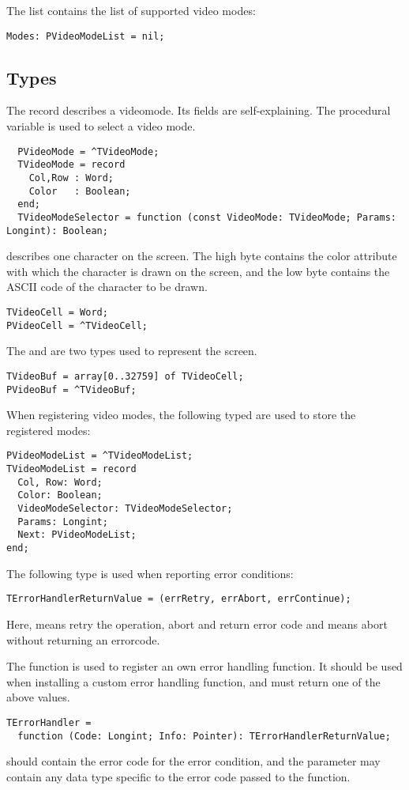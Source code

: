 The  list contains the list of supported video modes:
\begin{verbatim}
Modes: PVideoModeList = nil;
\end{verbatim}

\subsection{Types}
The  record describes a videomode. Its fields are
self-explaining. The  procedural variable
is used to select a video mode.
\begin{verbatim}
  PVideoMode = ^TVideoMode;
  TVideoMode = record
    Col,Row : Word;
    Color   : Boolean;
  end;
  TVideoModeSelector = function (const VideoMode: TVideoMode; Params: Longint): Boolean;
\end{verbatim}
 describes one character on the screen. The high byte
contains the color attribute with which the character is drawn on the screen,
and the low byte contains the ASCII code of the character to be drawn.
\begin{verbatim}
TVideoCell = Word;
PVideoCell = ^TVideoCell;
\end{verbatim}
The  and  are two types used to represent the
screen.
\begin{verbatim}
TVideoBuf = array[0..32759] of TVideoCell;
PVideoBuf = ^TVideoBuf;
\end{verbatim}
When registering video modes, the following typed are used to store the
registered modes:
\begin{verbatim}
PVideoModeList = ^TVideoModeList;
TVideoModeList = record
  Col, Row: Word;
  Color: Boolean;
  VideoModeSelector: TVideoModeSelector;
  Params: Longint;
  Next: PVideoModeList;
end;
\end{verbatim}
The following type is used when reporting error conditions:
\begin{verbatim}
TErrorHandlerReturnValue = (errRetry, errAbort, errContinue);
\end{verbatim}
Here,  means retry the operation, 
abort and return error code and  means abort
without returning an errorcode.

The  function is used to register an own error
handling function. It should be used when installing a custom error
handling function, and must return one of the above values.
\begin{verbatim}
TErrorHandler = 
  function (Code: Longint; Info: Pointer): TErrorHandlerReturnValue;
\end{verbatim}
 should contain the error code for the error condition, 
and the  parameter may contain any data type specific to 
the error code passed to the function.

